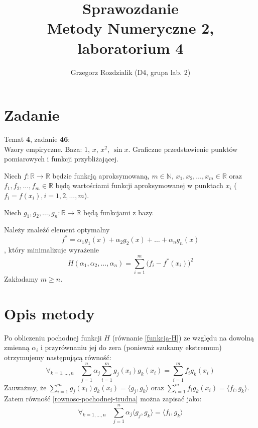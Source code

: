 \documentclass[12pt]{article}
\begin{document}
	\title{Sprawozdanie\\Metody Numeryczne 2, laboratorium 4}
	\author{Grzegorz Rozdzialik (D4, grupa lab. 2)}
	\maketitle	
	
	\section{Zadanie}
	{\Large Temat \textbf{4}, zadanie \textbf{46}:}\\
	Wzory empiryczne. Baza: $1$, $x$, $x^2$, $\sin x$. Graficzne przedstawienie punktów pomiarowych i funkcji przybliżającej.
	
	Niech $f: \mathbb{R} \to \mathbb{R}$ będzie funkcją aproksymowaną,
	$m \in \mathbb{N}$,
	$x_1, x_2, \dots, x_m \in \mathbb{R}$
	oraz $f_1, f_2, \dots, f_m \in \mathbb{R}$ będą wartościami funkcji aproksymowanej w punktach $x_i$ ($f_i = f(x_i), i = 1, 2, \dots, m$).
	
	Niech $g_1, g_2, \dots, g_n: \mathbb{R} \to \mathbb{R}$ będą funkcjami z bazy.
	
	Należy znaleźć element optymalny
	\begin{equation}
	f^* = \alpha_1 g_1(x) + \alpha_2 g_2(x) + \dots + \alpha_n g_n(x) \label{element-optymalny}
	\end{equation},
	który minimalizuje wyrażenie
	\begin{equation}
	H(\alpha_1, \alpha_2, \dots, \alpha_n) = \sum_{i=1}^{m} \Big(f_i - f^*(x_i)\Big)^2
	\label{funkcja-H}
	\end{equation}
	Zakładamy $m \geq n$.
	
	
	\section{Opis metody}
	Po obliczeniu pochodnej funkcji $H$ (równanie \eqref{funkcja-H}) ze względu na dowolną zmienną $\alpha_i$ i przyrównaniu jej do zera (ponieważ szukamy ekstremum) otrzymujemy następującą równość:
	\begin{equation}
		\forall_{k = 1, \dots, n} \hspace{10pt}
		\sum_{j=1}^{n} \alpha_j \sum_{i=1}^{m} g_j(x_i) g_k(x_i) = \sum_{i=1}^{m} f_i g_k(x_i)
		\label{rownosc-pochodnej-trudna}
	\end{equation}
	Zauważmy, że $\sum_{i=1}^{m} g_j(x_i) g_k(x_i) = \langle g_j, g_k \rangle$ oraz 
	$\sum_{i=1}^{m} f_i g_k(x_i) = \langle f_i, g_k \rangle$. Zatem równość \eqref{rownosc-pochodnej-trudna} można zapisać jako:
	\begin{equation}
		\forall_{k = 1, \dots, n} \hspace{10pt}
		\sum_{j=1}^{n} \alpha_j \langle g_j, g_k \rangle = \langle f_i, g_k \rangle
		\label{rownosc-pochodnej-uproszczona}
	\end{equation}
	
\end{document}
